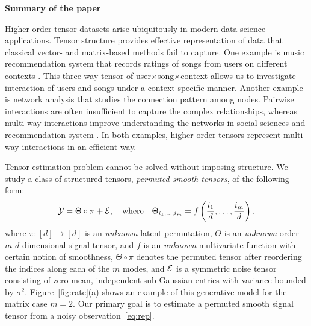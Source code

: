 \documentclass[11pt]{article}
\theoremstyle{definition}
\begin{document}
\clearpage
\singlespacing
{\bf\large Summary of the paper}

Higher-order tensor datasets arise ubiquitously in modern data science applications.
Tensor structure provides effective representation of data that classical vector- and matrix-based methods fail to capture. 
One example is music recommendation system that records ratings of songs from users on different contexts \citep{baltrunas2011incarmusic}. This three-way tensor of user$\times$song$\times$context allows us to investigate interaction of users and songs under a context-specific manner.
Another example is network analysis that studies the connection pattern among nodes.  Pairwise interactions are often insufficient to capture the complex relationships, whereas multi-way interactions improve understanding the networks in social sciences \citep{bickel2009nonparametric} and recommendation system \citep{han2020exact}. In both examples, higher-order tensors represent multi-way interactions in an efficient way.




Tensor estimation problem cannot be solved without imposing structure. We study a class of structured tensors, \emph{permuted smooth tensors}, of the following form:
\begin{equation}\label{eq:rep}
\mathcal{Y}=\Theta\circ \pi+\mathcal{E},\quad\text{where}\quad \Theta_{i_1,\ldots,i_m} = f\left({i_1\over d},\ldots,{i_m\over d}\right).
\end{equation}
where $\pi\colon[d]\rightarrow[d]$ is an \emph{unknown} latent permutation, $\Theta$ is an \emph{unknown} order-$m$ $d$-dimensional signal tensor, and $f$ is an \emph{unknown} multivariate function with certain notion of smoothness, $\Theta \circ \pi $ denotes the permuted tensor after reordering the indices along each of the $m$ modes, and $\mathcal{E}$ is a symmetric noise tensor consisting of zero-mean, independent sub-Gaussian entries with variance bounded by $\sigma^2$. Figure~\ref{fig:rate}(a) shows an example of this generative model for the matrix case $m=2$.  Our primary goal is to estimate a permuted smooth signal tensor from a noisy observation~\eqref{eq:rep}.  
\end{document}
